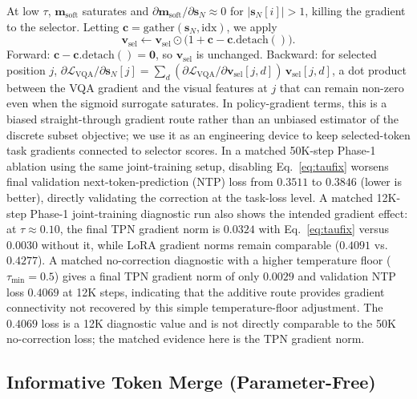 \documentclass[runningheads]{llncs}
\newcommand{\sN}{\mathbf{s}_N}
\newcommand{\vsel}{\mathbf{v}_{\mathrm{sel}}}
\newcommand{\Lvqa}{\mathcal{L}_{\mathrm{VQA}}}
\begin{document}
At low $\tau$, $\mathbf{m}_{\mathrm{soft}}$ saturates and
$\partial \mathbf{m}_{\mathrm{soft}}/\partial \sN\!\approx\!0$ for
$|\sN[i]|\!>\!1$, killing the gradient to the selector. Letting
$\mathbf{c}{=}\mathrm{gather}(\sN,\text{idx})$, we apply
\begin{equation}
\vsel \leftarrow \vsel \odot \bigl(1 + \mathbf{c} - \mathbf{c}.\mathrm{detach}()\bigr).
\label{eq:taufix}
\end{equation}
Forward: $\mathbf{c}{-}\mathbf{c}.\mathrm{detach}(){=}\mathbf{0}$, so
$\vsel$ is unchanged. Backward: for selected position $j$,
$\partial \Lvqa/\partial \sN[j]{=}\sum_d (\partial \Lvqa/\partial \vsel[j,d])\,\vsel[j,d]$,
a dot product between the VQA gradient and the visual features at $j$
that can remain non-zero even when the sigmoid surrogate saturates. In
policy-gradient terms, this is a biased straight-through gradient route
rather than an unbiased estimator of the discrete subset objective; we
use it as an engineering device to keep selected-token task gradients
connected to selector scores. In a matched 50K-step Phase-1 ablation
using the same joint-training setup, disabling Eq.~\ref{eq:taufix}
worsens final validation next-token-prediction (NTP) loss from
$0.3511$ to $0.3846$ (lower is better), directly validating the
correction at the task-loss level. A matched 12K-step Phase-1
joint-training diagnostic run also shows the intended gradient effect:
at $\tau{\approx}0.10$, the final TPN gradient norm is $0.0324$ with
Eq.~\ref{eq:taufix} versus $0.0030$ without it, while LoRA gradient norms remain comparable
($0.4091$ vs.\ $0.4277$). A matched no-correction diagnostic with a
higher temperature floor ($\tau_\mathrm{min}{=}0.5$) gives a final TPN
gradient norm of only $0.0029$ and validation NTP loss $0.4069$ at 12K
steps, indicating that the additive route provides gradient connectivity
not recovered by this simple temperature-floor adjustment. The
$0.4069$ loss is a 12K diagnostic value and is not directly comparable
to the 50K no-correction loss; the matched evidence here is the TPN
gradient norm.

\subsection{Informative Token Merge (Parameter-Free)}
\label{sec:merge}
\end{document}
